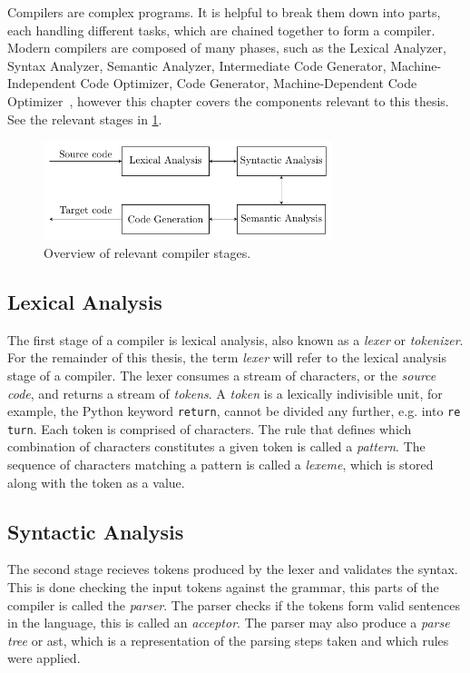 Compilers are complex programs. It is helpful to break them down into parts, each handling different tasks, which are chained together to form a compiler. Modern compilers are composed of many phases, such as the Lexical Analyzer, Syntax Analyzer, Semantic Analyzer, Intermediate Code Generator, Machine-Independent Code Optimizer, Code Generator, Machine-Dependent Code Optimizer~\cite[p. 5]{dragon}, however this chapter covers the components relevant to this thesis. See the relevant stages in \cref{fig:compiler-stages}.


\begin{figure}[H]\label{fig:compiler-stages}
  \centering
  \includegraphics[width=0.75\textwidth]{figures/compiler-stages.pdf}
  \caption{Overview of relevant compiler stages.}
\end{figure}

\subsection{Lexical Analysis}
The first stage of a compiler is lexical analysis, also known as a \emph{lexer} or \emph{tokenizer}. For the remainder of this thesis, the term \emph{lexer} will refer to the lexical analysis stage of a compiler. The lexer consumes a stream of characters, or the \emph{source code}, and returns a stream of \emph{tokens}. A \emph{token} is a lexically indivisible unit, for example, the Python keyword \texttt{return}, cannot be divided any further, e.g. into \texttt{re} \texttt{turn}. Each token is comprised of characters. The rule that defines which combination of characters constitutes a given token is called a \emph{pattern}. The sequence of characters matching a pattern is called a \emph{lexeme}, which is stored along with the token as a value.

\subsection{Syntactic Analysis}
The second stage recieves tokens produced by the lexer and validates the syntax. This is done checking the input tokens against the grammar, this parts of the compiler is called the \emph{parser}. The parser checks if the tokens form valid sentences in the language, this is called an \emph{acceptor}. The parser may also produce a \emph{parse tree} or \gls{ast}, which is a representation of the parsing steps taken and which rules were applied.

